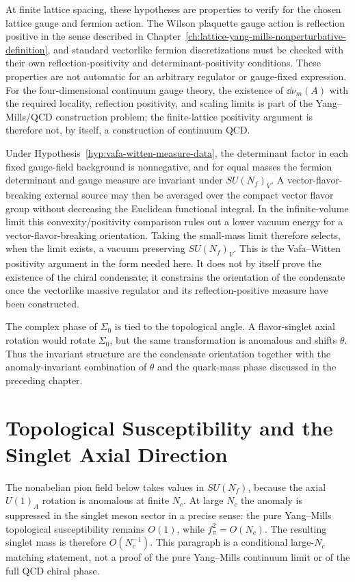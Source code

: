 At finite lattice spacing, these hypotheses are properties to verify for the
chosen lattice gauge and fermion action.  The Wilson plaquette gauge action is
reflection positive in the sense described in
Chapter~\ref{ch:lattice-yang-mills-nonperturbative-definition}, and standard
vectorlike fermion discretizations must be checked with their own
reflection-positivity and determinant-positivity conditions.  These properties
are not automatic for an arbitrary regulator or gauge-fixed expression.  For
the four-dimensional continuum gauge theory, the existence of \(\dd\nu_m(A)\)
with the required locality, reflection positivity, and scaling limits is part
of the Yang--Mills/QCD construction problem; the finite-lattice positivity
argument is therefore not, by itself, a construction of continuum QCD.

Under Hypothesis~\ref{hyp:vafa-witten-measure-data}, the determinant factor in
each fixed gauge-field background is nonnegative, and for equal masses the
fermion determinant and gauge measure are invariant under \(SU(N_f)_V\).  A
vector-flavor-breaking external source may then be averaged over the compact
vector flavor group without decreasing the Euclidean functional integral.  In
the infinite-volume limit this convexity/positivity comparison rules out a
lower vacuum energy for a vector-flavor-breaking orientation.  Taking the
small-mass limit therefore selects, when the limit exists, a vacuum preserving
\(SU(N_f)_V\).  This is the Vafa--Witten positivity argument in the form
needed here.  It does not by itself prove the existence of the chiral
condensate; it constrains the orientation of the condensate once the
vectorlike massive regulator and its reflection-positive measure have been
constructed.

The complex phase of \(\Sigma_0\) is tied to the topological angle.  A
flavor-singlet axial rotation would rotate \(\Sigma_0\), but the same
transformation is anomalous and shifts \(\theta\).  Thus the invariant structure
are the condensate orientation together with the anomaly-invariant
combination of \(\theta\) and the quark-mass phase discussed in the preceding
chapter.

\section{Topological Susceptibility and the Singlet Axial Direction}
\label{sec:qcd-topological-susceptibility-singlet}

The nonabelian pion field below takes values in \(SU(N_f)\), because the
axial \(U(1)_A\) rotation is anomalous at finite \(N_c\).  At large \(N_c\)
the anomaly is suppressed in the singlet meson sector in a precise sense:
the pure Yang--Mills topological susceptibility remains \(O(1)\), while
\(f_\pi^2=O(N_c)\).  The resulting singlet mass is therefore \(O(N_c^{-1})\).
This paragraph is a conditional large-\(N_c\) matching statement, not a proof
of the pure Yang--Mills continuum limit or of the full QCD chiral phase.

